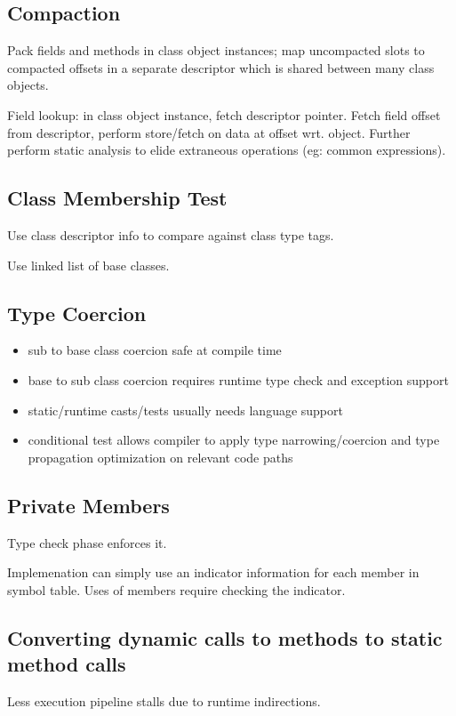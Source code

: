 \documentclass[8pt]{extarticle}
\begin{document}
\begin{multicols*}{2}
  \subsection{Compaction}
  Pack fields and methods in class object instances; map uncompacted slots to compacted offsets in a separate descriptor which is shared between many class objects.

  Field lookup: in class object instance, fetch descriptor pointer. Fetch field offset from descriptor, perform store/fetch on data at offset wrt. object.
  Further perform static analysis to elide extraneous operations (eg: common expressions).

  \subsection{Class Membership Test}
  Use class descriptor info to compare against class type tags.
  
  Use linked list of base classes.

  \subsection{Type Coercion}
  \begin{itemize}
  \item sub to base class coercion safe at compile time
  \item base to sub class coercion requires runtime type check and exception support
  \item static/runtime casts/tests usually needs language support
  \item conditional test allows compiler to apply type narrowing/coercion and type propagation optimization on relevant code paths
  \end{itemize}

  \subsection{Private Members}
  Type check phase enforces it.

  Implemenation can simply use an indicator information for each member in symbol table. Uses of members require checking the indicator.

  \subsection{Converting dynamic calls to methods to static method calls}
  Less execution pipeline stalls due to runtime indirections.
  

\end{multicols*}
\end{document}
